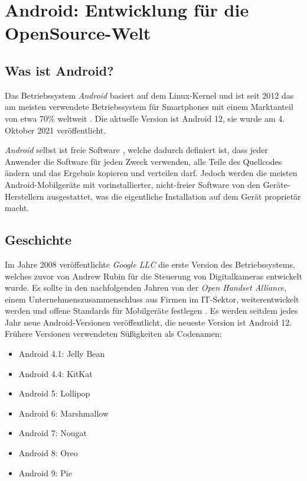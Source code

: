 \section{Android: Entwicklung für die OpenSource-Welt}
\label{androiddev}

\subsection{Was ist Android?}
Das Betriebssystem \textit{Android} basiert auf dem Linux-Kernel und ist seit 2012 das am meisten
verwendete Betriebssystem für Smartphones mit einem Marktanteil von etwa 70\% weltweit
\cite{mobileOsMarketShare}. Die aktuelle Version ist Android 12, sie wurde am 4. Oktober 2021
veröffentlicht.

\textit{Android} selbst ist freie Software \cite{androidOpenSourceProject}, welche dadurch definiert
ist, dass jeder Anwender die Software für jeden Zweck verwenden, alle Teile des Quellcodes
ändern und das Ergebnis kopieren und verteilen darf. Jedoch werden die meisten Android-Mobilgeräte
mit vorinstallierter, nicht-freier Software von den Geräte-Herstellern ausgestattet, was die
eigentliche Installation auf dem Gerät proprietär macht.

\subsection{Geschichte}
Im Jahre 2008 veröffentlichte \textit{Google LLC} die erste Version des Betriebssystems, welches
zuvor von Andrew Rubin für die Steuerung von Digitalkameras entwickelt wurde. Es sollte in den
nachfolgenden Jahren von der \textit{Open Handset Alliance}, einem Unternehmenszusammenschluss
aus Firmen im IT-Sektor, weiterentwickelt werden und offene Standards für Mobilgeräte festlegen
\cite{androidHistory}. Es werden seitdem jedes Jahr neue Android-Versionen veröffentlicht, die
neueste Version ist Android 12. Frühere Versionen verwendeten Süßigkeiten als Codenamen:

\begin{itemize}
  \item Android 4.1: Jelly Bean
  \item Android 4.4: KitKat
  \item Android 5: Lollipop
  \item Android 6: Marshmallow
  \item Android 7: Nougat
  \item Android 8: Oreo
  \item Android 9: Pie
\end{itemize}

